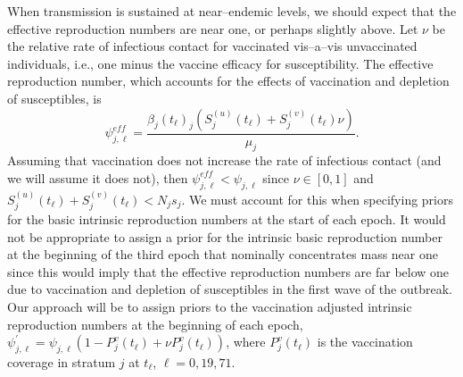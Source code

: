 When transmission is sustained at near--endemic levels, we should expect that the effective reproduction numbers are near one, or perhaps slightly above. Let $ \nu $ be the relative rate of infectious contact for vaccinated vis--a--vis unvaccinated individuals, i.e., one minus the vaccine efficacy for susceptibility. The effective reproduction number, which accounts for the effects of vaccination and depletion of susceptibles, is 
\begin{equation}
\label{eqn:Reff_t}
\psi_{j,\ell}^{eff} = \frac{\beta_j(t_\ell)_j\left (S^{(u)}_j(t_\ell) + S^{(v)}_j(t_\ell)\nu\right )}{\mu_j}.
\end{equation}
Assuming that vaccination does not increase the rate of infectious contact (and we will assume it does not), then $ \psi_{j,\ell}^{eff} < \psi_{j,\ell} $ since $ \nu\in[0,1] $ and $ S^{(u)}_j(t_\ell) + S^{(v)}_j(t_\ell) < N_js_j $. We must account for this when specifying priors for the basic intrinsic reproduction numbers at the start of each epoch. It would not be appropriate to assign a prior for the intrinsic basic reproduction number at the beginning of the third epoch that nominally concentrates mass near one since this would imply that the effective reproduction numbers are far below one due to vaccination and depletion of susceptibles in the first wave of the outbreak. Our approach will be to assign priors to the vaccination adjusted intrinsic reproduction numbers at the beginning of each epoch, $ \psi_{j,\ell}^\prime = \psi_{j,\ell}  \left (1 - P^v_j(t_\ell) + \nu P^v_j(t_\ell)\right ) $, where $ P_j^v(t_\ell) $ is the vaccination coverage in stratum $ j $ at $ t_\ell $, $ \ell = 0,19,71 $. 


